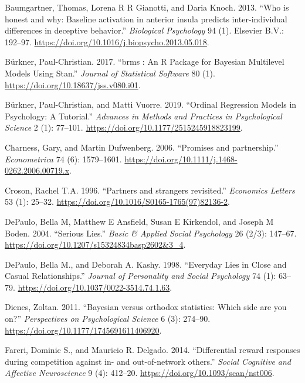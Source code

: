 \documentclass[smallextended]{svjour3}       %
\begin{document}
\leavevmode\hypertarget{ref-Baumgartner2013}{}%
Baumgartner, Thomas, Lorena R R Gianotti, and Daria Knoch. 2013. ``Who
is honest and why: Baseline activation in anterior insula predicts
inter-individual differences in deceptive behavior.'' \emph{Biological
Psychology} 94 (1). Elsevier B.V.: 192--97.
\url{https://doi.org/10.1016/j.biopsycho.2013.05.018}.

\leavevmode\hypertarget{ref-Burkner2017}{}%
Bürkner, Paul-Christian. 2017. ``brms : An R Package for Bayesian
Multilevel Models Using Stan.'' \emph{Journal of Statistical Software}
80 (1). \url{https://doi.org/10.18637/jss.v080.i01}.

\leavevmode\hypertarget{ref-Burkner2019}{}%
Bürkner, Paul-Christian, and Matti Vuorre. 2019. ``Ordinal Regression
Models in Psychology: A Tutorial.'' \emph{Advances in Methods and
Practices in Psychological Science} 2 (1): 77--101.
\url{https://doi.org/10.1177/2515245918823199}.

\leavevmode\hypertarget{ref-Charness2006}{}%
Charness, Gary, and Martin Dufwenberg. 2006. ``Promises and
partnership.'' \emph{Econometrica} 74 (6): 1579--1601.
\url{https://doi.org/10.1111/j.1468-0262.2006.00719.x}.

\leavevmode\hypertarget{ref-Croson1996}{}%
Croson, Rachel T.A. 1996. ``Partners and strangers revisited.''
\emph{Economics Letters} 53 (1): 25--32.
\url{https://doi.org/10.1016/S0165-1765(97)82136-2}.

\leavevmode\hypertarget{ref-DePaulo2004}{}%
DePaulo, Bella M, Matthew E Ansfield, Susan E Kirkendol, and Joseph M
Boden. 2004. ``Serious Lies.'' \emph{Basic \& Applied Social Psychology}
26 (2/3): 147--67. \url{https://doi.org/10.1207/s15324834basp2602\&3_4}.

\leavevmode\hypertarget{ref-DePaulo1998}{}%
DePaulo, Bella M., and Deborah A. Kashy. 1998. ``Everyday Lies in Close
and Casual Relationships.'' \emph{Journal of Personality and Social
Psychology} 74 (1): 63--79.
\url{https://doi.org/10.1037/0022-3514.74.1.63}.

\leavevmode\hypertarget{ref-Dienes2011}{}%
Dienes, Zoltan. 2011. ``Bayesian versus orthodox statistics: Which side
are you on?'' \emph{Perspectives on Psychological Science} 6 (3):
274--90. \url{https://doi.org/10.1177/1745691611406920}.

\leavevmode\hypertarget{ref-Fareri2014}{}%
Fareri, Dominic S., and Mauricio R. Delgado. 2014. ``Differential reward
responses during competition against in- and out-of-network others.''
\emph{Social Cognitive and Affective Neuroscience} 9 (4): 412--20.
\url{https://doi.org/10.1093/scan/nst006}.
\end{document}
